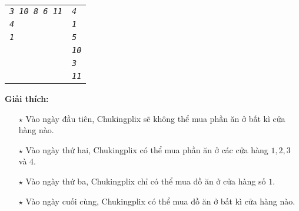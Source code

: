\begin{ex}
\begin{center}
\begin{tabular}{|l|l|}
			\textit{\texttt{3 10 8 6 11}} & \textit{\texttt{4}} \\ %
			\textit{\texttt{4}} & \textit{\texttt{1}} \\ %
			\textit{\texttt{1}} & \textit{\texttt{5}} \\ %
			& \textit{\texttt{10}} \\
			& \textit{\texttt{3}} \\
			& \textit{\texttt{11}} \\
			\hline
		\end{tabular}
	\end{center}
	\textbf{Giải thích: }
	\begin{itemize}
		\item[$\star$] Vào ngày đầu tiên, Chukingplix sẽ không thể mua phần ăn ở bất kì cửa hàng nào. 
		\item[$\star$] Vào ngày thứ hai, Chukingplix có thể mua phần ăn ở các cửa hàng $1,2,3$ và $4$. 
		\item[$\star$] Vào ngày thứ ba, Chukingplix chỉ có thể mua đồ ăn ở cửa hàng số $1$. 
		\item[$\star$] Vào ngày cuối cùng, Chukingplix có thể mua đồ ăn ở bất kì cửa hàng nào. 
	\end{itemize}
\end{ex}




